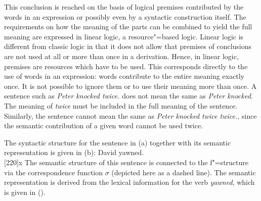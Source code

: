 This conclusion is reached on the basis of logical premises contributed by the words in an
expression or possibly even by a syntactic construction itself. The requirements on how the meaning
of the parts can be combined to yield the full meaning are expressed in linear logic, a
resource"=based logic. Linear logic is different from classic logic in that it does not allow that
premises of conclusions are not used at all or more than once in a derivation. Hence, in linear logic, premises
are resources which have to be used. This corresponds directly to the use of words in an expression:
words contribute to the entire meaning exactly once. It is not possible to ignore them or to use
their meaning more than once. A sentence such as \emph{Peter knocked twice.} does not mean the same as \emph{Peter knocked}. The meaning of
\emph{twice} must be included in the full meaning of the sentence. Similarly, the sentence cannot
mean the same as \emph{Peter knocked twice twice.}, since the semantic contribution of a given word cannot be used twice.

The syntactic structure for the sentence in (a) together with its semantic representation is
given in (b):
\eal
\ex David yawned.
\ex ~\\[-\baselineskip]
\hspace*{-2em}
{}%
\hspace*{3em}%
{}%
\hspace*{2em}%
\Aput*{$\phi$}
[220]{x}
\Bput*{$\sigma$}
\zl
% 
The semantic structure of this sentence is connected to the f"=structure via the correspondence function $\sigma$ (depicted here as a dashed line). The semantic representation is
derived from the lexical information for the verb \emph{yawned}, which is given in ().

